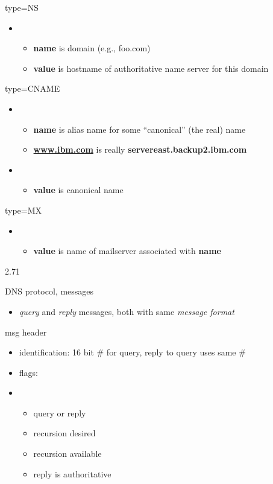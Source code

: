 \documentclass[
]{article}
\begin{document}
type=NS

\begin{itemize}
\item
  \begin{itemize}
  \item
    \textbf{name} is domain (e.g., foo.com)
  \item
    \textbf{value} is hostname of authoritative name server for this
    domain
  \end{itemize}
\end{itemize}

type=CNAME

\begin{itemize}
\item
  \begin{itemize}
  \item
    \textbf{name} is alias name for some ``canonical'' (the real) name
  \item
    \textbf{\url{www.ibm.com}} is really
    \textbf{servereast.backup2.ibm.com}
  \end{itemize}
\item
  \begin{itemize}
  \item
    \textbf{value} is canonical name
  \end{itemize}
\end{itemize}

type=MX

\begin{itemize}
\item
  \begin{itemize}
  \item
    \textbf{value} is name of mailserver associated with \textbf{name}
  \end{itemize}
\end{itemize}

2.71

DNS protocol, messages

\begin{itemize}
\item
  \emph{query} and \emph{reply} messages, both with same \emph{message
  format}
\end{itemize}

msg header

\begin{itemize}
\item
  identification: 16 bit \# for query, reply to query uses same \#
\item
  flags:
\item
  \begin{itemize}
  \item
    query or reply
  \item
    recursion desired
  \item
    recursion available
  \item
    reply is authoritative
  \end{itemize}
\end{itemize}
\end{document}
